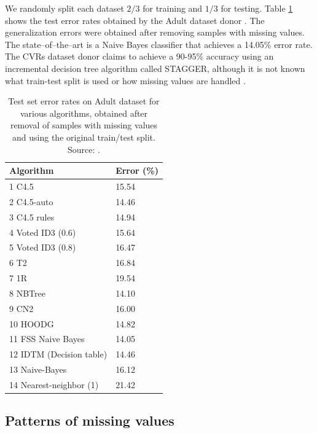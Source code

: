 \documentclass[10pt,twocolumn,letterpaper]{article}
\begin{document}
We randomly split each dataset $2/3$ for training and $1/3$ for testing. Table \ref{tab:benchmarks} shows the test error rates obtained by the Adult dataset donor \cite{kohavi1996}. The generalization errors were obtained after removing samples with missing values. The state--of--the--art is a Naive Bayes classifier that achieves a  14.05\% error rate. The CVRs dataset donor claims to achieve a 90-95\% accuracy using an incremental decision tree algorithm called STAGGER, although it is not known what train-test split is used or how missing values are handled \cite{schlimmer1987,schlimmer1986}.

\begin{table}[htb]
\begin{center}
\begin{tabular}{@{}ll@{}}
\toprule
\textbf{Algorithm}       & \textbf{Error (\%)} \\ \midrule
1  C4.5                  & 15.54          \\
2  C4.5-auto             & 14.46          \\
3  C4.5 rules            & 14.94          \\
4  Voted ID3 (0.6)       & 15.64          \\
5  Voted ID3 (0.8)       & 16.47          \\
6  T2                    & 16.84          \\
7  1R                    & 19.54          \\
8  NBTree                & 14.10          \\
9  CN2                   & 16.00          \\
10 HOODG                 & 14.82          \\
      \rowcolor{Gray}
11 FSS Naive Bayes       & 14.05          \\
12 IDTM (Decision table) & 14.46          \\
13 Naive-Bayes           & 16.12          \\
14 Nearest-neighbor (1)  & 21.42          \\ \bottomrule
\end{tabular}
\caption{Test set error rates on Adult dataset for various algorithms, obtained after removal of samples with missing values and using the original train/test split. Source: \cite{Lichman2013}.}
\label{tab:benchmarks}
   \end{center}
\end{table}

\subsection{Patterns of missing values}
\end{document}
